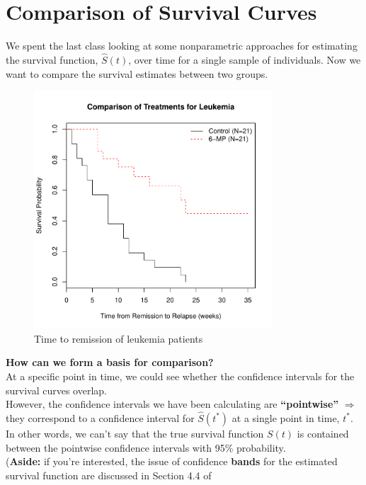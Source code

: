 \documentclass[11pt,slidesonly,semrot,portrait,palatino]{book}
\begin{document}
\setlength{\evensidemargin}{0in}
\setlength{\oddsidemargin}{.5in}
\setlength{\topmargin}{0in}
\setlength{\textwidth}{6in}
\setlength{\textheight}{9in}
%
\setcounter{chapter}{3} \setcounter{page}{49}
\chapter{Comparison of Survival Curves}
We spent the last class looking at some nonparametric
approaches for estimating the survival function,
$\hat{S}(t)$, over time for a single sample of individuals.
Now we want to compare the survival estimates between two
groups.
\vspace*{-.25in}
\begin{figure}[h!]
\centerline{\includegraphics[width=3.5in]{surv_both.pdf}}
\caption{Time to remission of leukemia patients}
\end{figure}
\clearpage
\noindent
{\bf How can we form a basis for comparison?}
\\[2ex]
At a specific point in time, we could see whether the confidence
intervals for the survival curves overlap.
\\[2ex]
However, the confidence intervals we have been calculating are
{\bf ``pointwise''}  $\Rightarrow$ they correspond to a confidence
interval for $\hat{S}(t^*)$ at a single point in time, $t^{*}$.
In other words, we can't say that the true survival function
$S(t)$ is contained between the pointwise confidence intervals with 95\%
probability.
\\[2ex]
({\bf Aside:} if you're interested, the issue of confidence {\bf bands}
for the estimated survival function are discussed in Section 4.4 of
\end{document}
